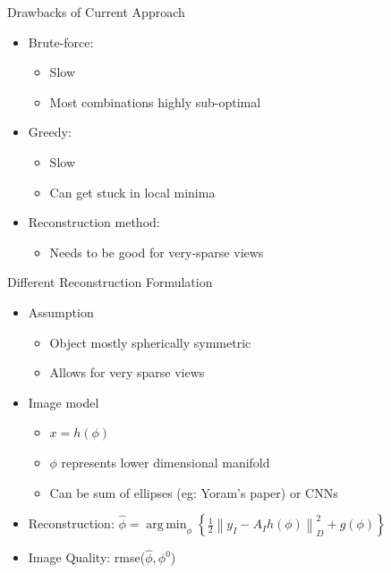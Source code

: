 \documentclass[english,aspectratio=43]{beamer}
\DeclareMathOperator*{\argmin}{arg\,min}
\newcommand{\norm}[1]{\left\lVert#1\right\rVert}
\begin{document}
\begin{frame}{Drawbacks of Current Approach}
	\begin{itemize}
	\setlength\itemsep{2em}
	    \item Brute-force:
	        \begin{itemize}
	            \item Slow
	            \item Most combinations highly sub-optimal
	        \end{itemize}
	    
	    \item Greedy:
	        \begin{itemize}
	            \item Slow
	            \item Can get stuck in local minima
	        \end{itemize}
	        
	    \item Reconstruction method:
            \begin{itemize}
                \item Needs to be good for very-sparse views
            \end{itemize}
	    
	\end{itemize}
\end{frame}

\begin{frame}{Different Reconstruction Formulation}
	\begin{itemize}
	\setlength\itemsep{2em}
	    \item Assumption 
	        \begin{itemize}
                \item Object mostly spherically symmetric
                \item Allows for very sparse views
            \end{itemize}
            
            \item Image model
            \begin{itemize}
                \item $x=h(\phi)$
                \item $\phi$ represents lower dimensional manifold
                \item Can be sum of ellipses (eg: Yoram's paper) or CNNs
            \end{itemize}
            
            
            \item Reconstruction:  $ \hat{\phi} = \argmin_{\phi} \left\{ \frac{1}{2} \norm{y_I - A_I h(\phi) }^2_D + g(\phi) \right\}$
            
            \item Image Quality: rmse($\hat{\phi}, \phi^0$)

	\end{itemize}
\end{frame}
\end{document}
